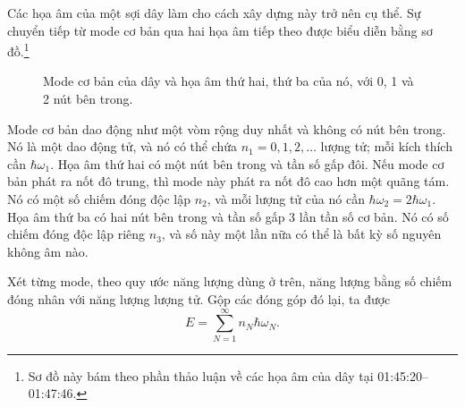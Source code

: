 Các họa âm của một sợi dây làm cho cách xây dựng này trở nên cụ thể. Sự chuyển tiếp từ mode cơ bản qua hai họa âm tiếp theo được biểu diễn bằng sơ đồ.\footnote{Sơ đồ này bám theo phần thảo luận về các họa âm của dây tại 01:45:20--01:47:46.}

\begin{figure}[t]
\centering
{}
\caption{Mode cơ bản của dây và họa âm thứ hai, thứ ba của nó, với 0, 1 và 2 nút bên trong.}
\end{figure}

Mode cơ bản dao động như một vòm rộng duy nhất và không có nút bên trong. Nó là một dao động tử, và nó có thể chứa \(n_1=0,1,2,\ldots\) lượng tử; mỗi kích thích cần \(\hbar\omega_1\). Họa âm thứ hai có một nút bên trong và tần số gấp đôi. Nếu mode cơ bản phát ra nốt đô trung, thì mode này phát ra nốt đô cao hơn một quãng tám. Nó có một số chiếm đóng độc lập \(n_2\), và mỗi lượng tử của nó cần \(\hbar\omega_2=2\hbar\omega_1\). Họa âm thứ ba có hai nút bên trong và tần số gấp 3 lần tần số cơ bản. Nó có số chiếm đóng độc lập riêng \(n_3\), và số này một lần nữa có thể là bất kỳ số nguyên không âm nào.

Xét từng mode, theo quy ước năng lượng dùng ở trên, năng lượng bằng số chiếm đóng nhân với năng lượng lượng tử. Gộp các đóng góp đó lại, ta được
\begin{equation}
E=\sum_{N=1}^{\infty} n_N\hbar\omega_N.
\end{equation}

